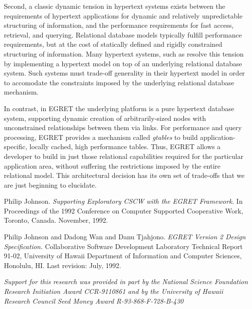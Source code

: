 Second, a classic dynamic tension in hypertext systems exists between
the requirements of hypertext applications for dynamic and relatively
unpredictable structuring of information, and the performance
requirements for fast access, retrieval, and querying.  Relational
database models typically fulfill performance requirements, but at the
cost of statically defined and rigidly constrained structuring of
information.  Many hypertext systems, such as resolve this tension by
implementing a hypertext model on top of an underlying relational
database system.  Such systems must trade-off generality in their
hypertext model in order to accomodate the constraints imposed by the
underlying relational database mechanism.

In contrast, in EGRET the underlying platform is a pure hypertext
database system, supporting dynamic creation of arbitrarily-sized
nodes with unconstrained relationships between them via links.  For
performance and query processing, EGRET provides a mechanism called
{\em gtables} to build application-specific, locally cached, high
performance tables.  Thus, EGRET allows a developer to build in just
those relational capabilities required for the particular application
area, without suffering the restrictions imposed by the entire
relational model. This architectural decision has its own set of
trade-offs that we are just beginning to elucidate.

\begin{thebibliography}{9}

Philip Johnson. {\em Supporting Exploratory CSCW with the EGRET
Framework.} In Proceedings of the 1992 Conference on Computer
Supported Cooperative Work, Toronto, Canada. November, 1992.

Philip Johnson and Dadong Wan and Danu Tjahjono. {\em 
EGRET Version 2 Design Specification.} Collaborative
Software Development Laboratory Technical Report 91-02, 
University of Hawaii Department of Information and Computer Sciences,
Honolulu, HI. Last revision: July, 1992.

\end{thebibliography}

{\it Support for this research was provided in part by the
National Science Foundation Research Initiation Award CCR-9110861 and
by the University of Hawaii Research Council Seed Money Award
R-93-868-F-728-B-430}

